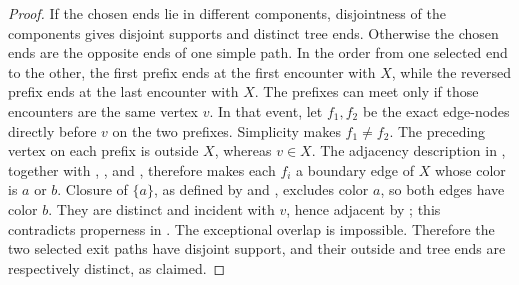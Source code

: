\begin{proof}
If the chosen ends lie in different components, disjointness of the
components gives disjoint supports and distinct tree ends.  Otherwise
the chosen ends are the opposite ends of one simple path.  In the order
from one selected end to the other, the first prefix ends at the first
encounter with $X$, while the reversed prefix ends at the last encounter
with $X$.  The prefixes can meet only if those encounters are the same
vertex $v$.  In that event, let $f_1,f_2$ be the exact edge-nodes directly
before $v$ on the two prefixes.  Simplicity makes $f_1\ne f_2$.  The
preceding vertex on each prefix is outside $X$, whereas $v\in X$.
The adjacency description in , together
with , , and
, therefore makes each $f_i$ a boundary edge of
$X$ whose color is $a$ or $b$.  Closure of $\{a\}$, as defined by
 and , excludes
color $a$, so both edges have color $b$.  They are distinct and incident
with $v$, hence adjacent by ; this contradicts
properness in .  The exceptional overlap is
impossible.  Therefore the two selected exit paths have disjoint support,
and their outside and tree ends are respectively distinct, as claimed.
\end{proof}
